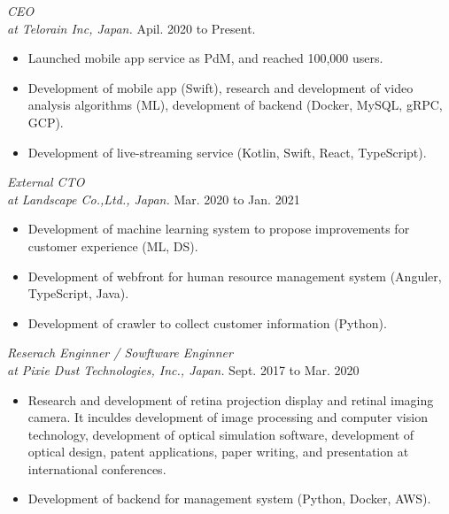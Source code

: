 \documentclass[margin]{res}
\begin{document}
\begin{resume}
{\sl CEO \\ at Telorain Inc, Japan.} \hfill Apil. 2020 to Present. \\

\begin{itemize}  \itemsep -2pt
  \item Launched mobile app service as PdM, and reached 100,000 users.
  \item Development of mobile app (Swift), research and development of video analysis algorithms (ML), development of backend (Docker, MySQL, gRPC, GCP).
  \item Development of live-streaming service (Kotlin, Swift, React, TypeScript).
\end{itemize}

{\sl External CTO \\ at Landscape Co.,Ltd., Japan.} \hfill Mar. 2020 to Jan. 2021 \\

\begin{itemize}  \itemsep -2pt
  \item Development of machine learning system to propose improvements for customer experience (ML, DS).
  \item Development of webfront for human resource management system (Anguler, TypeScript, Java).
  \item Development of crawler to collect customer information (Python).
\end{itemize}

{\sl Reserach Enginner / Sowftware Enginner \\ at Pixie Dust Technologies, Inc., Japan.} \hfill Sept. 2017 to Mar. 2020 \\

\begin{itemize}  \itemsep -2pt
  \item Research and development of retina projection display and retinal imaging camera. It inculdes development of image processing and computer vision technology, development of optical simulation software, development of optical design, patent applications, paper writing, and presentation at international conferences.
  \item Development of backend for management system (Python, Docker, AWS).
\end{itemize}



\end{resume}
\end{document}
